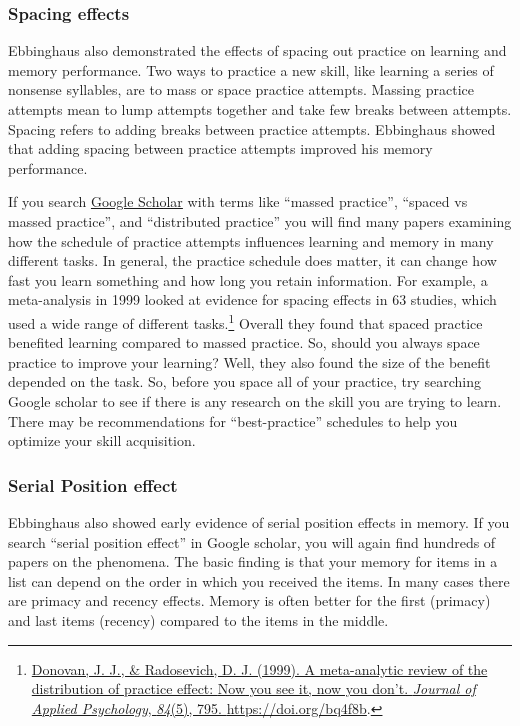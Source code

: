 \documentclass[
  oneside,
  12pt]{crumpbook}
\begin{document}
\hypertarget{spacing-effects}{%
\subsubsection{Spacing effects}\label{spacing-effects}}

Ebbinghaus also demonstrated the effects of spacing out practice on learning and memory performance. Two ways to practice a new skill, like learning a series of nonsense syllables, are to mass or space practice attempts. Massing practice attempts mean to lump attempts together and take few breaks between attempts. Spacing refers to adding breaks between practice attempts. Ebbinghaus showed that adding spacing between practice attempts improved his memory performance.

If you search \href{https://scholar.google.com/}{Google Scholar} with terms like ``massed practice'', ``spaced vs massed practice'', and ``distributed practice'' you will find many papers examining how the schedule of practice attempts influences learning and memory in many different tasks. In general, the practice schedule does matter, it can change how fast you learn something and how long you retain information. For example, a meta-analysis in 1999 looked at evidence for spacing effects in 63 studies, which used a wide range of different tasks.\footnote{\protect\hyperlink{ref-donovanMetaanalyticReviewDistribution1999}{Donovan, J. J., \& Radosevich, D. J. (1999). A meta-analytic review of the distribution of practice effect: {Now} you see it, now you don't. \emph{Journal of Applied Psychology}, \emph{84}(5), 795. \url{https://doi.org/bq4f8b}}.} Overall they found that spaced practice benefited learning compared to massed practice. So, should you always space practice to improve your learning? Well, they also found the size of the benefit depended on the task. So, before you space all of your practice, try searching Google scholar to see if there is any research on the skill you are trying to learn. There may be recommendations for ``best-practice'' schedules to help you optimize your skill acquisition.

\hypertarget{serial-position-effect}{%
\subsubsection{Serial Position effect}\label{serial-position-effect}}

Ebbinghaus also showed early evidence of serial position effects in memory. If you search ``serial position effect'' in Google scholar, you will again find hundreds of papers on the phenomena. The basic finding is that your memory for items in a list can depend on the order in which you received the items. In many cases there are primacy and recency effects. Memory is often better for the first (primacy) and last items (recency) compared to the items in the middle.
\end{document}
